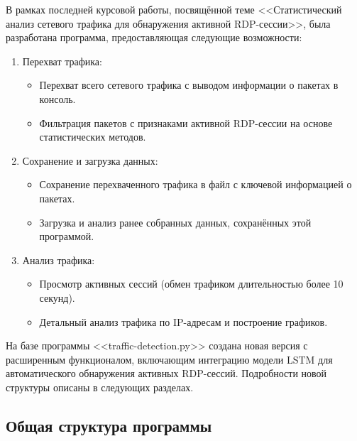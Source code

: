 \documentclass[bachelor, och, coursework]{SCWorks}
\begin{document}


В рамках последней курсовой работы, посвящённой теме <<Статистический анализ сетевого трафика для обнаружения активной RDP-сессии>>, была разработана 
программа, предоставляющая следующие возможности:

\begin{enumerate}
  \item Перехват трафика:
  
  \begin{itemize}
    \item Перехват всего сетевого трафика с выводом информации о пакетах в консоль.
    \item Фильтрация пакетов с признаками активной RDP-сессии на основе статистических методов.
  \end{itemize}
  \item Сохранение и загрузка данных:
  \begin{itemize}
    \item Сохранение перехваченного трафика в файл с ключевой информацией о пакетах.
    \item Загрузка и анализ ранее собранных данных, сохранённых этой программой.
  \end{itemize}
  \item Анализ трафика:
  \begin{itemize}
    \item Просмотр активных сессий (обмен трафиком длительностью более 10 секунд).
    \item Детальный анализ трафика по IP-адресам и построение графиков.
  \end{itemize}

\end{enumerate}

  На базе программы <<traffic-detection.py>> создана новая версия с расширенным функционалом, включающим интеграцию модели 
  LSTM для автоматического обнаружения активных RDP-сессий. Подробности новой структуры описаны в следующих разделах.

\subsection{Общая структура программы}
\end{document}
